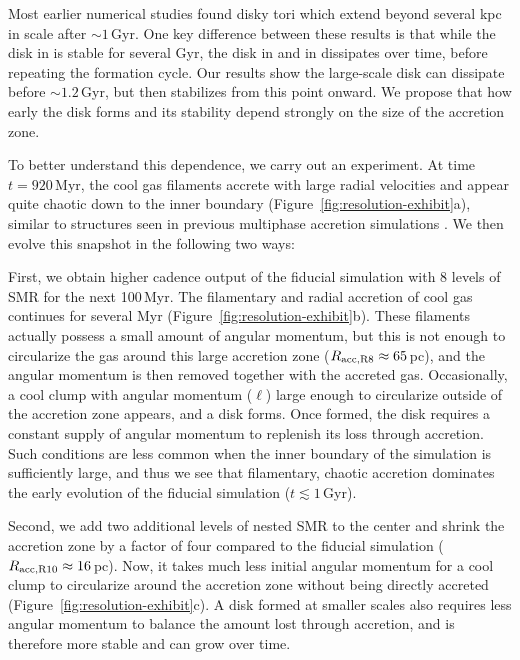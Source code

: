 Most earlier numerical studies found disky tori which extend beyond several kpc in scale after $\sim 1$\,Gyr.
One key difference between these results is that while the disk in \citet{li_2014a,li_2014b} is stable for several Gyr, the disk in \citet{prasad_cool_2015} and in \citet{wang_agn_2019} dissipates over time, before repeating the formation cycle.
Our results show the large-scale disk can dissipate before $\sim 1.2$\,Gyr, but then stabilizes from this point onward.
We propose that how early the disk forms and its stability depend strongly on the size of the accretion zone.



To better understand this dependence, we carry out an experiment.
At time $t=920\,$Myr, the cool gas filaments accrete with large radial velocities and appear quite chaotic down to the inner boundary (Figure~\ref{fig:resolution-exhibit}a), similar to structures seen in previous multiphase accretion simulations \citep{beckmann_dense_2019,guo_magnetized_2024}.
We then evolve this snapshot in the following two ways:

First, we obtain higher cadence output of the fiducial simulation with 8 levels of SMR for the next 100\,Myr.
The filamentary and radial accretion of cool gas continues for several Myr (Figure~\ref{fig:resolution-exhibit}b).
These filaments actually possess a small amount of angular momentum, but this is not enough to circularize the gas around this large accretion zone ($R_{\rm acc,R8} \approx 65$\,pc), and the angular momentum is then removed together with the accreted gas.
Occasionally, a cool clump with angular momentum ($\ell$) large enough to circularize outside of the accretion zone appears, and a disk forms.
Once formed, the disk requires a constant supply of angular momentum to replenish its loss through accretion.
Such conditions are less common when the inner boundary of the simulation is sufficiently large, and thus we see that filamentary, chaotic accretion dominates the early evolution of the fiducial simulation ($t \lesssim 1$\,Gyr).

Second, we add two additional levels of nested SMR to the center and shrink the accretion zone by a factor of four compared to the fiducial simulation ($R_{\rm acc,R10} \approx 16$\,pc).
Now, it takes much less initial angular momentum for a cool clump to circularize around the accretion zone without being directly accreted (Figure~\ref{fig:resolution-exhibit}c).
A disk formed at smaller scales also requires less angular momentum to balance the amount lost through accretion, and is therefore more stable and can grow over time.

